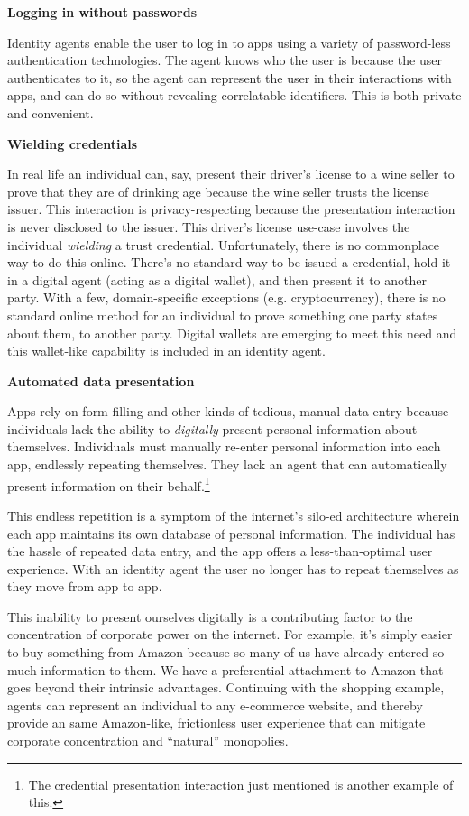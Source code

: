 \documentclass[11pt, oneside]{article}   	%
\begin{document}
\textbf{Logging in without passwords}

Identity agents enable the user to log in to apps using a variety of password-less authentication technologies. The agent knows who the user is because the user authenticates to it, so the agent can represent the user in their interactions with apps, and can do so without revealing correlatable identifiers. This is both private and convenient.

\textbf{Wielding credentials}

In real life an individual can, say, present their driver's license to a wine seller to prove that they are of drinking age because the wine seller trusts the license issuer. This interaction is privacy-respecting because the presentation interaction is never disclosed to the issuer. This driver's license use-case involves the individual \emph{wielding} a trust credential. Unfortunately, there is no commonplace way to do this online. There's no standard way to be issued a credential, hold it in a digital agent (acting as a digital wallet), and then present it to another party. With a few, domain-specific exceptions (e.g. cryptocurrency), there is no standard online method for an individual to prove something one party states about them, to another party. Digital wallets are emerging to meet this need and this wallet-like capability is included in an identity agent.

\textbf{Automated data presentation}

Apps rely on form filling and other kinds of tedious, manual data entry because individuals lack the ability to \emph{digitally} present personal information about themselves. Individuals must manually re-enter personal information into each app, endlessly repeating themselves. They lack an agent that can automatically present information on their behalf.\footnote{The credential presentation interaction just mentioned is another example of this.} 

This endless repetition is a symptom of the internet's silo-ed architecture wherein each app maintains its own database of personal information. The individual has the hassle of repeated data entry, and the app offers a less-than-optimal user experience. With an identity agent the user no longer has to repeat themselves as they move from app to app.

This inability to present ourselves digitally is a contributing factor to the concentration of corporate power on the internet. For example, it's simply easier to buy something from Amazon because so many of us have already entered so much information to them. We have a preferential attachment to Amazon that goes beyond their intrinsic advantages. Continuing with the shopping example, agents can represent an individual to any e-commerce website, and thereby provide an same Amazon-like, frictionless user experience that can mitigate corporate concentration and ``natural'' monopolies. 
\end{document}
